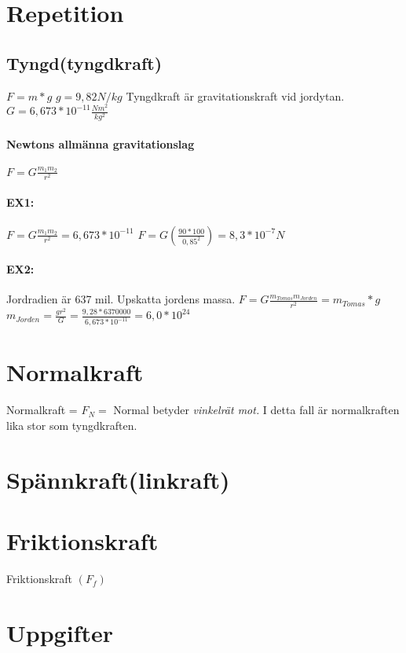 \documentclass[a4paper,11pt]{article}
\begin{document}
\begin{flushleft}
\section{Repetition}
\subsection{Tyngd(tyngdkraft)}
$ F=m*g $\newline
$ g=9,82 N/kg $\newline
Tyngdkraft är gravitationskraft vid jordytan.\newline
$ G=6,673*10^{-11}\frac{Nm^2}{kg^2} $
\paragraph{Newtons allmänna gravitationslag}
$ F=G\frac{m_1 m_2}{r^2} $
\paragraph{EX1:}
$ F=G\frac{m_1 m_2}{r^2}=6,673*10^{-11} $\newline
$ F=G(\frac{90*100}{0,85^2})=8,3*10^{-7}N $\newline
\paragraph{EX2:}
Jordradien är 637 mil. Upskatta jordens massa.\newline
$ F=G\frac{m_{Tomas} m_{Jorden}}{r^2}=m_{Tomas}*g $\newline
$ m_{Jorden}=\frac{gr^2}{G}=\frac{9,28*6370000}{6,673*10^{-11}}=6,0*10^{24} $
\section{Normalkraft}
Normalkraft = $F_N=$\newline
Normal betyder \textit{vinkelrät mot.}\newline
I detta fall är normalkraften lika stor som tyngdkraften.
\section{Spännkraft(linkraft)}
\section{Friktionskraft}
Friktionskraft $( F_f )$\newline
\newpage
\section{Uppgifter}

\end{flushleft}
\end{document}
